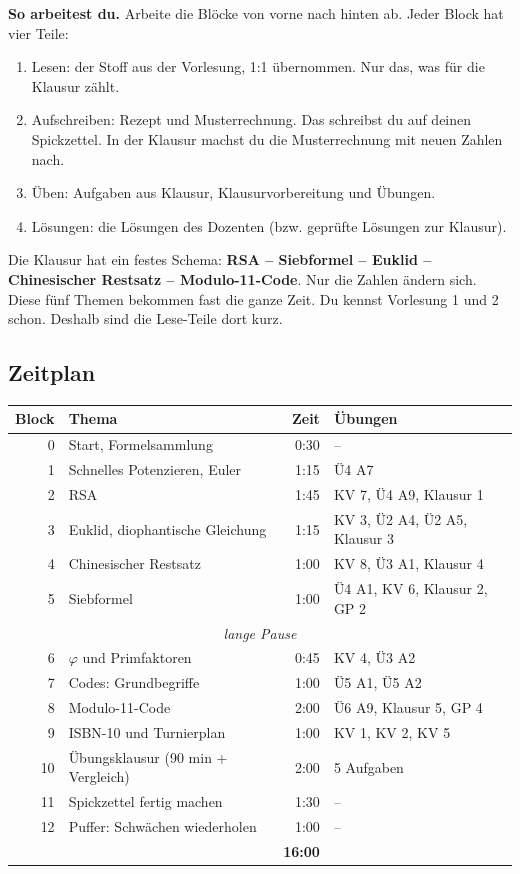 \begin{merke}
\textbf{So arbeitest du.} Arbeite die Blöcke von vorne nach hinten ab. Jeder Block hat vier Teile:
\begin{enumerate}
\item \colorbox{blue!10}{Lesen}: der Stoff aus der Vorlesung, 1:1 übernommen. Nur das, was für die Klausur zählt.
\item \colorbox{orange!15}{Aufschreiben}: Rezept und Musterrechnung. Das schreibst du auf deinen Spickzettel.
      In der Klausur machst du die Musterrechnung mit neuen Zahlen nach.
\item \colorbox{green!12}{Üben}: Aufgaben aus Klausur, Klausurvorbereitung und Übungen.
\item \colorbox{gray!15}{Lösungen}: die Lösungen des Dozenten (bzw. geprüfte Lösungen zur Klausur).
\end{enumerate}
Die Klausur hat ein festes Schema: \textbf{RSA -- Siebformel -- Euklid -- Chinesischer Restsatz -- Modulo-11-Code}.
Nur die Zahlen ändern sich. Diese fünf Themen bekommen fast die ganze Zeit.
Du kennst Vorlesung 1 und 2 schon. Deshalb sind die Lese-Teile dort kurz.
\end{merke}

\subsection*{Zeitplan}
\begin{tabular}{@{}rp{6.2cm}rp{6.8cm}@{}}
\toprule
Block & Thema & Zeit & Übungen\\
\midrule
0 & Start, Formelsammlung & 0:30 & --\\
1 & Schnelles Potenzieren, Euler & 1:15 & Ü4 A7\\
2 & RSA & 1:45 & KV 7, Ü4 A9, Klausur 1\\
3 & Euklid, diophantische Gleichung & 1:15 & KV 3, Ü2 A4, Ü2 A5, Klausur 3\\
4 & Chinesischer Restsatz & 1:00 & KV 8, Ü3 A1, Klausur 4\\
5 & Siebformel & 1:00 & Ü4 A1, KV 6, Klausur 2, GP 2\\
\multicolumn{4}{c}{\textit{lange Pause}}\\
6 & $\varphi$ und Primfaktoren & 0:45 & KV 4, Ü3 A2\\
7 & Codes: Grundbegriffe & 1:00 & Ü5 A1, Ü5 A2\\
8 & Modulo-11-Code & 2:00 & Ü6 A9, Klausur 5, GP 4\\
9 & ISBN-10 und Turnierplan & 1:00 & KV 1, KV 2, KV 5\\
10 & Übungsklausur (90 min + Vergleich) & 2:00 & 5 Aufgaben\\
11 & Spickzettel fertig machen & 1:30 & --\\
12 & Puffer: Schwächen wiederholen & 1:00 & --\\
\midrule
 & & \textbf{16:00} & \\
\bottomrule
\end{tabular}


